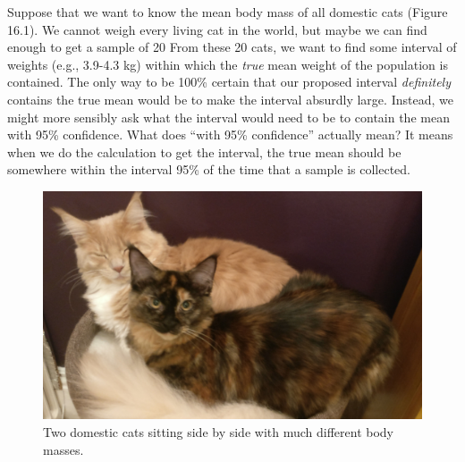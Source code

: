 \documentclass[
]{scrbook}
\begin{document}
Suppose that we want to know the mean body mass of all domestic cats (Figure 16.1).
We cannot weigh every living cat in the world, but maybe we can find enough to get a sample of 20
From these 20 cats, we want to find some interval of weights (e.g., 3.9-4.3 kg) within which the \emph{true} mean weight of the population is contained.
The only way to be 100\% certain that our proposed interval \emph{definitely} contains the true mean would be to make the interval absurdly large.
Instead, we might more sensibly ask what the interval would need to be to contain the mean with 95\% confidence.
What does ``with 95\% confidence'' actually mean?
It means when we do the calculation to get the interval, the true mean should be somewhere within the interval 95\% of the time that a sample is collected.

\begin{figure}
\includegraphics[width=1\linewidth]{img/housecats} \caption{Two domestic cats sitting side by side with much different body masses.}\label{fig:unnamed-chunk-79}
\end{figure}
\end{document}
